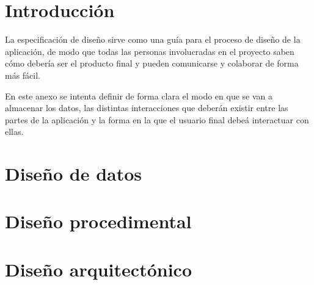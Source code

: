 \label{cha:Especificación de diseño}

\section{Introducción}

La especificación de diseño sirve como una guía para el proceso de diseño de la
aplicación, de modo que todas las personas involucradas en el proyecto saben
cómo debería ser el producto final y pueden comunicarse y colaborar de forma más
fácil.

En este anexo se intenta definir de forma clara el modo en que se van a
almacenar los datos, las distintas interacciones que deberán existir entre las
partes de la aplicación y la forma en la que el usuario final debeá interactuar
con ellas.

\section{Diseño de datos}



\section{Diseño procedimental}

\section{Diseño arquitectónico}


